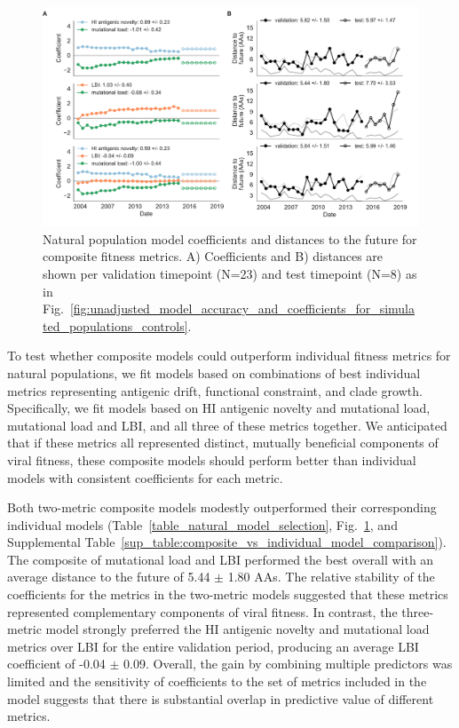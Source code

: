 \begin{figure}[htb]
  \begin{center}
  \includegraphics[width=\textwidth]{figures/best-composite-unadjusted-model-accuracy-and-coefficients-for-natural-populations.pdf}
  \caption{
    Natural population model coefficients and distances to the future for composite fitness metrics.
    A) Coefficients and B) distances are shown per validation timepoint (N=23) and test timepoint (N=8) as in Fig.~\ref{fig:unadjusted_model_accuracy_and_coefficients_for_simulated_populations_controls}.
  }
  \label{fig:unadjusted_composite_model_accuracy_and_coefficients_for_natural_populations}
  \end{center}
\end{figure}

To test whether composite models could outperform individual fitness metrics for natural populations, we fit models based on combinations of best individual metrics representing antigenic drift, functional constraint, and clade growth.
Specifically, we fit models based on HI antigenic novelty and mutational load, mutational load and LBI, and all three of these metrics together.
We anticipated that if these metrics all represented distinct, mutually beneficial components of viral fitness, these composite models should perform better than individual models with consistent coefficients for each metric.

Both two-metric composite models modestly outperformed their corresponding individual models (Table~\ref{table_natural_model_selection}, Fig.~\ref{fig:unadjusted_composite_model_accuracy_and_coefficients_for_natural_populations}, and Supplemental Table~\ref{sup_table:composite_vs_individual_model_comparison}).
The composite of mutational load and LBI performed the best overall with an average distance to the future of 5.44 $\pm$ 1.80 AAs.
The relative stability of the coefficients for the metrics in the two-metric models suggested that these metrics represented complementary components of viral fitness.
In contrast, the three-metric model strongly preferred the HI antigenic novelty and mutational load metrics over LBI for the entire validation period, producing an average LBI coefficient of -0.04 $\pm$ 0.09.
Overall, the gain by combining multiple predictors was limited and the sensitivity of coefficients to the set of metrics included in the model suggests that there is substantial overlap in predictive value of different metrics.

